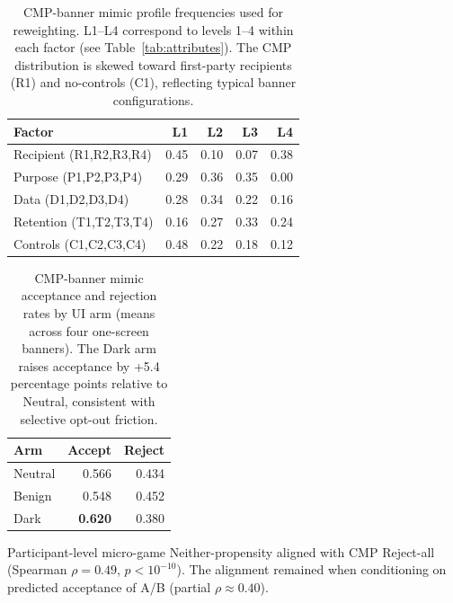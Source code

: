 \documentclass{eusset}
\begin{document}
\begin{table}[h]
  \centering
  \begin{tabular}{l r r r r}
    \textbf{Factor} & \textbf{L1} & \textbf{L2} & \textbf{L3} & \textbf{L4} \\
    \hline
    Recipient (R1,R2,R3,R4) & 0.45 & 0.10 & 0.07 & 0.38 \\
    Purpose (P1,P2,P3,P4)   & 0.29 & 0.36 & 0.35 & 0.00 \\
    Data (D1,D2,D3,D4)      & 0.28 & 0.34 & 0.22 & 0.16 \\
    Retention (T1,T2,T3,T4) & 0.16 & 0.27 & 0.33 & 0.24 \\
    Controls (C1,C2,C3,C4)  & 0.48 & 0.22 & 0.18 & 0.12 \\
  \end{tabular}
  \caption{CMP-banner mimic profile frequencies used for reweighting. L1--L4 correspond to levels 1--4 within each factor (see Table~\ref{tab:attributes}). The CMP distribution is skewed toward first-party recipients (R1) and no-controls (C1), reflecting typical banner configurations.}
  \label{tab:cmpdist}
\end{table}


\begin{table}[h]
  \centering
  \begin{tabular}{l r r}
    \textbf{Arm} & \textbf{Accept} & \textbf{Reject} \\
    \hline
    Neutral & 0.566 & 0.434 \\
    Benign  & 0.548 & 0.452 \\
    Dark    & \textbf{0.620} & 0.380 \\
  \end{tabular}
  \caption{CMP-banner mimic acceptance and rejection rates by UI arm (means across four one-screen banners). The Dark arm raises acceptance by +5.4 percentage points relative to Neutral, consistent with selective opt-out friction.}
  \label{tab:cmp_accept}
\end{table}

\noindent Participant-level micro-game Neither-propensity aligned with CMP Reject-all (Spearman $\rho=0.49$, $p<10^{-10}$). The alignment remained when conditioning on predicted acceptance of A/B (partial $\rho\approx 0.40$).
\end{document}

